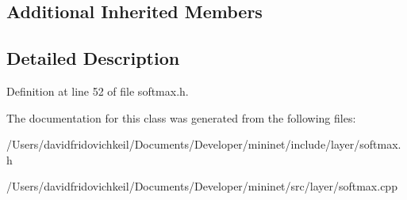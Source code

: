 \subsection*{Additional Inherited Members}


\subsection{Detailed Description}


Definition at line 52 of file softmax.\+h.



The documentation for this class was generated from the following files\+:\begin{DoxyCompactItemize}
\item 
/\+Users/davidfridovichkeil/\+Documents/\+Developer/mininet/include/layer/softmax.\+h\item 
/\+Users/davidfridovichkeil/\+Documents/\+Developer/mininet/src/layer/softmax.\+cpp\end{DoxyCompactItemize}
